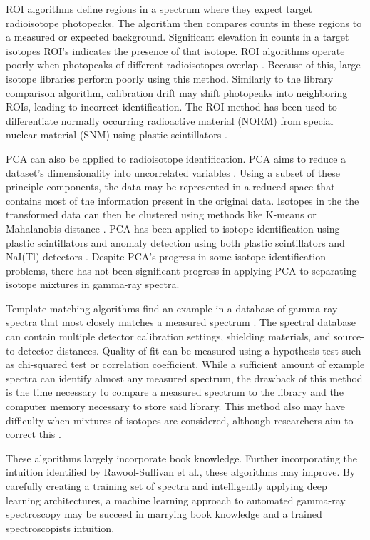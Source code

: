 ROI algorithms define regions in a spectrum where they expect target radioisotope photopeaks. The algorithm then compares counts in these regions to a measured or expected background. Significant elevation in counts in a target isotopes ROI's indicates the presence of that isotope. ROI algorithms operate poorly when photopeaks of different radioisotopes overlap \cite{burr2009}. Because of this, large isotope libraries perform poorly using this method. Similarly to the library comparison algorithm, calibration drift may shift photopeaks into neighboring ROIs, leading to incorrect identification. The ROI method has been used to differentiate normally occurring radioactive material (NORM) from special nuclear material (SNM) using plastic scintillators \cite{Ely2006}.

PCA can also be applied to radioisotope identification. PCA aims to reduce a dataset's dimensionality into uncorrelated variables \cite{Jolliffe2002}. Using a subset of these principle components, the data may be represented in a reduced space that contains most of the information present in the original data. Isotopes in the the transformed data can then be clustered using methods like K-means or Mahalanobis distance \cite{Kanungo2002, Kumari2012}. PCA has been applied to isotope identification using plastic scintillators \cite{Boardman2012} and anomaly detection using both plastic scintillators and NaI(Tl) detectors \cite{runkle2006b}. Despite PCA's progress in some isotope identification problems, there has not been significant progress in applying PCA to separating isotope mixtures in gamma-ray spectra.

Template matching algorithms find an example in a database of gamma-ray spectra that most closely matches a measured spectrum \cite{burr2009}. The spectral database can contain multiple detector calibration settings, shielding materials, and source-to-detector distances. Quality of fit can be measured using a hypothesis test such as chi-squared test or correlation coefficient. While a sufficient amount of example spectra can identify almost any measured spectrum, the drawback of this method is the time necessary to compare a measured spectrum to the library and the computer memory necessary to store said library. This method also may have difficulty when mixtures of isotopes are considered, although researchers aim to correct this \cite{mattingly2010}.

These algorithms largely incorporate book knowledge. Further incorporating the intuition identified by Rawool-Sullivan et al., these algorithms may improve. By carefully creating a training set of spectra and intelligently applying deep learning architectures, a machine learning approach to automated gamma-ray spectroscopy may be succeed in marrying book knowledge and a trained spectroscopists intuition.


